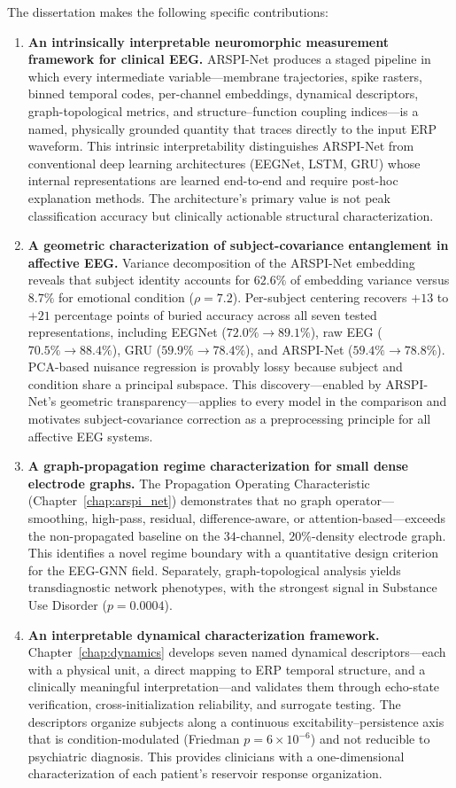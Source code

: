 The dissertation makes the following specific contributions:
\begin{enumerate}
    \item \textbf{An intrinsically interpretable neuromorphic measurement framework for clinical EEG.} ARSPI-Net produces a staged pipeline in which every intermediate variable---membrane trajectories, spike rasters, binned temporal codes, per-channel embeddings, dynamical descriptors, graph-topological metrics, and structure--function coupling indices---is a named, physically grounded quantity that traces directly to the input ERP waveform. This intrinsic interpretability distinguishes ARSPI-Net from conventional deep learning architectures (EEGNet, LSTM, GRU) whose internal representations are learned end-to-end and require post-hoc explanation methods. The architecture's primary value is not peak classification accuracy but clinically actionable structural characterization.
    \item \textbf{A geometric characterization of subject-covariance entanglement in affective EEG.} Variance decomposition of the ARSPI-Net embedding reveals that subject identity accounts for $62.6\%$ of embedding variance versus $8.7\%$ for emotional condition ($\rho = 7.2$). Per-subject centering recovers $+13$ to $+21$ percentage points of buried accuracy across all seven tested representations, including EEGNet ($72.0\% \to 89.1\%$), raw EEG ($70.5\% \to 88.4\%$), GRU ($59.9\% \to 78.4\%$), and ARSPI-Net ($59.4\% \to 78.8\%$). PCA-based nuisance regression is provably lossy because subject and condition share a principal subspace. This discovery---enabled by ARSPI-Net's geometric transparency---applies to every model in the comparison and motivates subject-covariance correction as a preprocessing principle for all affective EEG systems.
    \item \textbf{A graph-propagation regime characterization for small dense electrode graphs.} The Propagation Operating Characteristic (Chapter~\ref{chap:arspi_net}) demonstrates that no graph operator---smoothing, high-pass, residual, difference-aware, or attention-based---exceeds the non-propagated baseline on the $34$-channel, $20\%$-density electrode graph. This identifies a novel regime boundary with a quantitative design criterion for the EEG-GNN field. Separately, graph-topological analysis yields transdiagnostic network phenotypes, with the strongest signal in Substance Use Disorder ($p = 0.0004$).
    \item \textbf{An interpretable dynamical characterization framework.} Chapter~\ref{chap:dynamics} develops seven named dynamical descriptors---each with a physical unit, a direct mapping to ERP temporal structure, and a clinically meaningful interpretation---and validates them through echo-state verification, cross-initialization reliability, and surrogate testing. The descriptors organize subjects along a continuous excitability--persistence axis that is condition-modulated (Friedman $p = 6 \times 10^{-6}$) and not reducible to psychiatric diagnosis. This provides clinicians with a one-dimensional characterization of each patient's reservoir response organization.

\end{enumerate}
